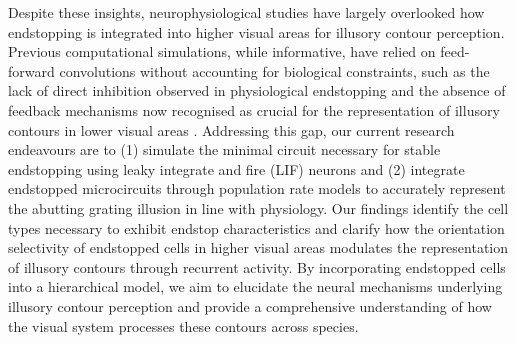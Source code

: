 \documentclass[12pt]{article}
\begin{document}
\bigbreak
Despite these insights, neurophysiological studies have largely overlooked how endstopping is integrated into higher visual areas for illusory contour perception. Previous computational simulations, while informative, have relied on feed-forward convolutions without accounting for biological constraints, such as the lack of direct inhibition observed in physiological endstopping \autocite{sillitoContributionExcitatoryInhibitory1977} and the absence of feedback mechanisms now recognised as crucial for the representation of illusory contours in lower visual areas \autocite{pakTopDownFeedbackControls2020}. Addressing this gap, our current research endeavours are to (1) simulate the minimal circuit necessary for stable endstopping using leaky integrate and fire (LIF) neurons and (2) integrate endstopped microcircuits through population rate models to accurately represent the abutting grating illusion in line with physiology. Our findings identify the cell types necessary to exhibit endstop characteristics and clarify how the orientation selectivity of endstopped cells in higher visual areas modulates the representation of illusory contours through recurrent activity. By incorporating endstopped cells into a hierarchical model, we aim to elucidate the neural mechanisms underlying illusory contour perception and provide a comprehensive understanding of how the visual system processes these contours across species.

\newpage
\end{document}
